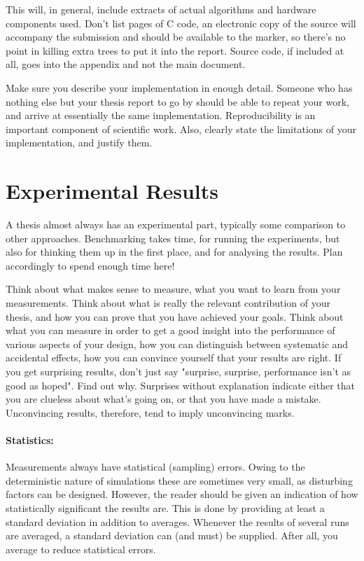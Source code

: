 \documentclass[a4paper,twoside, openright,12pt]{report}
\begin{document}
This will, in general, include extracts of actual algorithms and hardware components used. Don't list pages of C code, an electronic copy of the source will accompany the submission and should be available to the marker, so there's no point in killing extra trees to put it into the report. Source code, if included at all, goes into the appendix and not the main document.

Make sure you describe your implementation in enough detail. Someone who has nothing else but your thesis report to go by should be able to repeat your work, and arrive at essentially the same implementation. Reproducibility is an important component of scientific work. Also, clearly state the limitations of your implementation, and justify them.

\section{Experimental Results}

A thesis almost always has an experimental part, typically some comparison to other approaches. Benchmarking takes time, for running the experiments, but also for thinking them up in the first place, and for analysing the results. Plan accordingly to spend enough time here!

Think about what makes sense to measure, what you want to learn from your measurements. Think about what is really the relevant contribution of your thesis, and how you can prove that you have achieved your goals. Think about what you can measure in order to get a good insight into the performance of various aspects of your design, how you can distinguish between systematic and accidental effects, how you can convince yourself that your results are right. If you get surprising results, don't just say "surprise, surprise, performance isn't as good as hoped". Find out why. Surprises without explanation indicate either that you are clueless about what's going on, or that you have made a mistake. Unconvincing results, therefore, tend to imply unconvincing marks. 

\paragraph{Statistics:} Measurements always have statistical (sampling) errors. Owing to the deterministic nature of simulations these are sometimes very small, as disturbing factors can be designed. However, the reader should be given an indication of how statistically significant the results are. This is done by providing at least a standard deviation in addition to averages. Whenever the results of several runs are averaged, a standard deviation can (and must) be supplied. After all, you average to reduce statistical errors.
\end{document}
